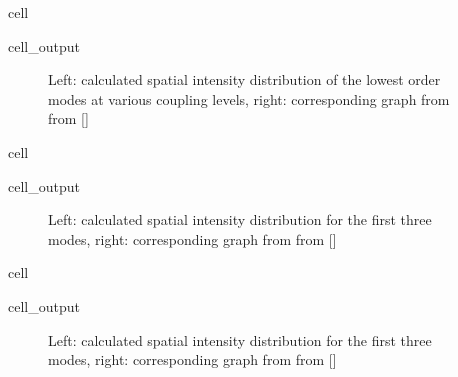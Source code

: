 \documentclass[a4paper,10pt,english,openany,oneside]{jupyterBook}
\begin{document}
\begin{sphinxuseclass}{cell}\begin{sphinxVerbatimOutput}

\begin{sphinxuseclass}{cell_output}
\begin{figure}[htbp]
\centering
\capstart

\noindent{}
\caption{Left: calculated  spatial intensity distribution of the lowest order modes at various coupling levels, right: corresponding graph from from {[}{]}}\label{\detokenize{Kogelnik-Shank_Coupled-Wave-Theory_DFB-Lasers:kogelnik10c}}\end{figure}

\end{sphinxuseclass}\end{sphinxVerbatimOutput}

\end{sphinxuseclass}
\begin{sphinxuseclass}{cell}\begin{sphinxVerbatimOutput}

\begin{sphinxuseclass}{cell_output}
\begin{figure}[htbp]
\centering
\capstart

\noindent{}
\caption{Left: calculated spatial intensity distribution for the first three modes, right: corresponding graph from from {[}{]}}\label{\detokenize{Kogelnik-Shank_Coupled-Wave-Theory_DFB-Lasers:kogelnik11ac}}\end{figure}

\end{sphinxuseclass}\end{sphinxVerbatimOutput}

\end{sphinxuseclass}
\begin{sphinxuseclass}{cell}\begin{sphinxVerbatimOutput}

\begin{sphinxuseclass}{cell_output}
\begin{figure}[htbp]
\centering
\capstart

\noindent{}
\caption{Left: calculated spatial intensity distribution for the first three modes, right: corresponding graph from from {[}{]}}\label{\detokenize{Kogelnik-Shank_Coupled-Wave-Theory_DFB-Lasers:kogelnik11bc}}\end{figure}

\end{sphinxuseclass}\end{sphinxVerbatimOutput}

\end{sphinxuseclass}
\end{document}
